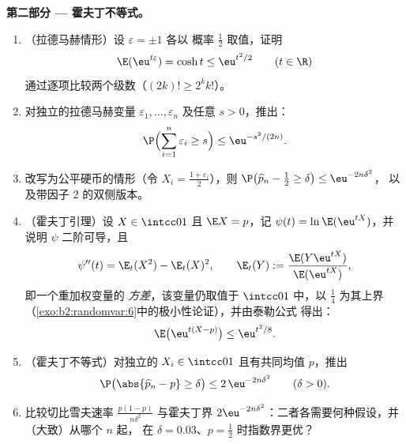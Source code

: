 \begin{problem}
\medskip
\noindent\textbf{第二部分 --- 霍夫丁不等式。}
\begin{enumerate}[resume]
  \item （拉德马赫情形）设 $\varepsilon = \pm1$ 各以
        概率 $\frac12$ 取值，证明
        \[
        \E(\eu^{t\varepsilon}) = \cosh t \leq \eu^{t^2/2}
        \qquad (t \in \R)
        \]
        通过逐项比较两个级数（$(2k)! \geq
        2^kk!$）。
  \item 对独立的拉德马赫变量
        $\varepsilon_1, \dots, \varepsilon_n$ 及任意 $s >
        0$，推出：
        \[
        \P\Bigl(\sum_{i=1}^n\varepsilon_i \geq s\Bigr)
        \leq \eu^{-s^2/(2n)} .
        \]
  \item 改写为公平硬币的情形（令 $X_i =
        \frac{1+\varepsilon_i}2$），则 $\P\bigl(\widehat p_n -
        \tfrac12 \geq \delta\bigr) \leq \eu^{-2n\delta^2}$，
        以及带因子 $2$ 的双侧版本。
  \item （霍夫丁引理）设 $X \in \intcc01$ 且 $\E X =
        p$，记 $\psi(t) = \ln\E(\eu^{tX})$，并说明
        $\psi$ 二阶可导，且
        \[
        \psi''(t) = \E_t(X^2) - \E_t(X)^2, \qquad
        \E_t(Y) := \frac{\E(Y\eu^{tX})}{\E(\eu^{tX})},
        \]
        即一个重加权变量的 \emph{方差}，该变量仍取值于
        $\intcc01$ 中，以 $\frac14$ 为其上界
        （\cref{exo:b2:randomvar:6}中的极小性论证），并由泰勒公式
        得出：
        \[
        \E\bigl(\eu^{t(X - p)}\bigr) \leq \eu^{t^2/8} .
        \]
  \item （霍夫丁不等式）对独立的 $X_i \in
        \intcc01$ 且有共同均值 $p$，推出
        \[
        \P\bigl(\abs{\widehat p_n - p} \geq \delta\bigr)
        \leq 2\,\eu^{-2n\delta^2}
        \qquad (\delta > 0).
        \]
  \item 比较切比雪夫速率
        $\frac{p(1-p)}{n\delta^2}$ 与霍夫丁界
        $2\eu^{-2n\delta^2}$：二者各需要何种假设，并
        （大致）从哪个 $n$ 起，
        在 $\delta = 0.03$、$p =
        \frac12$ 时指数界更优？
\end{enumerate}


\end{problem}

